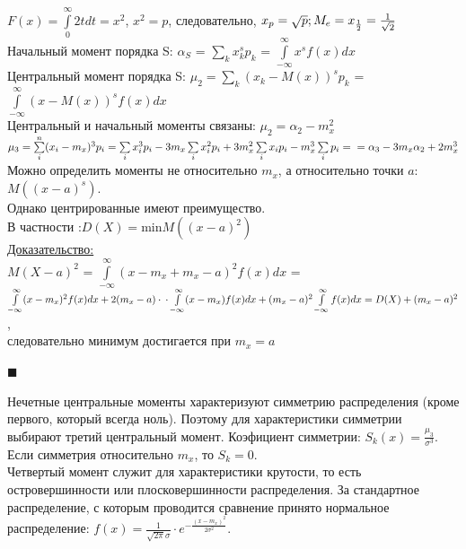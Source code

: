 \documentclass[russian, 12pt, fleqn,x11names]{article}
\begin{document}
$F(x) = \int\limits_{0}^{\infty}2tdt = x^2$, $x^2 = p$, следовательно, $x_p = \sqrt{p};\\
 M_e = x_\frac{1}{2} = \frac{1}{\sqrt{2}}$\\
Начальный момент порядка S: $\alpha_S$ = $\sum\limits_{k} x^s_kp_k$  = $\int\limits_{-\infty}^{\infty}x^sf(x)dx$\\
Центральный момент порядка S:  $\mu_2 = \sum\limits_{k}^{}(x_k-M(x))^sp_k$  = $\int\limits_{-\infty}^{\infty}(x- M(x))^sf(x)dx$\\
Центральный и начальный моменты связаны: $\mu_2 = \alpha_2 - m_x^2$\\
$\mu_3 = \sum\limits_{i}^{n}(x_i-m_x)^3p_i =\sum\limits_{i}^{}x_i^3p_i - 3m_x\sum\limits_{i}^{ }x_i^2p_i + 3m_x^2\sum\limits_{i}^{ }x_ip_i - m_x^3\sum\limits_{i}^{ }p_i = \\
= \alpha_3 - 3 m_x \alpha_2  + 2m_x^3$\\
Можно определить моменты не относительно $m_x$, а относительно точки $a$:\\ $M((x-a)^s)$.\\
Однако центрированные имеют преимущество.
\\В  частности :$D(X) = $min$ M((x-a)^2)$\\
\underline{Доказательство:}\\
$M(X-a)^2$ = $\int\limits_{-\infty}^{\infty}(x-m_x+m_x-a)^2f(x)dx$ = $\int\limits_{-\infty}^{\infty}(x-m_x)^2f(x)dx + 2(m_x-a)\cdot \\
 \cdot \int\limits_{-\infty}^{\infty}(x-m_x)f(x)dx + (m_x - a)^2 \int\limits_{-\infty}^{\infty} f(x)dx = D(X) + (m_x-a)^2$,\\ следовательно минимум достигается при $m_x=a$
\begin{flushright}\(\blacksquare\)\end{flushright}
Нечетные центральные моменты характеризуют симметрию распределения (кроме первого, который всегда ноль). Поэтому для характеристики симметрии выбирают третий центральный  момент.
Коэфициент симметрии: $S_k(x) = \frac{\mu_3}{\sigma^3}$.\\
Если симметрия относительно $m_x$, то $S_k = 0$.\\
Четвертый момент служит для характеристики крутости, то есть\\
 островершинности или плосковершинности распределения. За стандартное распределение,  с которым проводится сравнение принято нормальное распределение: $f(x) = \frac{1}{\sqrt{2\pi}\sigma}\cdot e^{-\frac{(x-m_x)^2}{2\sigma^2}}$. \\
\end{document}
